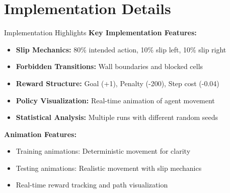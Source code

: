 \documentclass[aspectratio=169]{beamer}
\begin{document}
\section{Implementation Details}

\begin{frame}{Implementation Highlights}
    \textbf{Key Implementation Features:}
    \begin{itemize}
        \item \textbf{Slip Mechanics:} 80\% intended action, 10\% slip left, 10\% slip right
        \item \textbf{Forbidden Transitions:} Wall boundaries and blocked cells
        \item \textbf{Reward Structure:} Goal (+1), Penalty (-200), Step cost (-0.04)
        \item \textbf{Policy Visualization:} Real-time animation of agent movement
        \item \textbf{Statistical Analysis:} Multiple runs with different random seeds
    \end{itemize}
    
    \vspace{0.5cm}
    \textbf{Animation Features:}
    \begin{itemize}
        \item Training animations: Deterministic movement for clarity
        \item Testing animations: Realistic movement with slip mechanics
        \item Real-time reward tracking and path visualization
    \end{itemize}
\end{frame}
\end{document}
